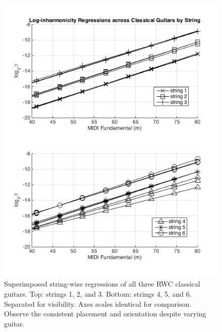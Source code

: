 \documentclass[12pt]{cmuthesis}
\begin{document}
\begin{figure}[!htbp] 
\label{fig:traj-compare-cg}
\centering
\includegraphics[scale=0.75]{traj-compare-cg}
\caption{Superimposed string-wise regressions of all three RWC classical guitars. Top: strings 1, 2, and 3. Bottom: strings 4, 5, and 6. Separated for visibility. Axes scales identical for comparison. Observe the consistent placement and orientation despite varying guitar.}
\end{figure}
\end{document}
